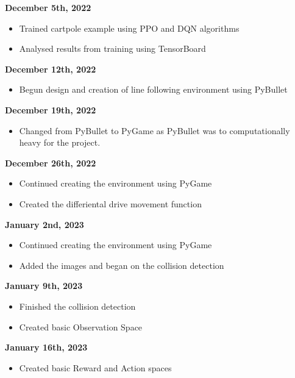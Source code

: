 \documentclass[a4paper,12pt]{article}
\begin{document}
\vspace{.7cm}
\textbf{\large December 5th, 2022}
\begin{itemize}
  \item Trained cartpole example using PPO and DQN algorithms
  \item Analysed results from training using TensorBoard

\end{itemize}
\vspace{.7cm}
\textbf{\large December 12th, 2022}
\begin{itemize}
  \item Begun design and creation of line following environment using PyBullet

\end{itemize}
\vspace{.7cm}
\textbf{\large December 19th, 2022}
\begin{itemize}
  \item Changed from PyBullet to PyGame as PyBullet was to computationally heavy for the project.

\end{itemize}
\vspace{.7cm}
\textbf{\large December 26th, 2022}
\begin{itemize}
  \item Continued creating the environment using PyGame
  \item Created the differiental drive movement function

\end{itemize}
\vspace{.7cm}
\textbf{\large January 2nd, 2023}
\begin{itemize}
  \item Continued creating the environment using PyGame
  \item Added the images and began on the collision detection

\end{itemize}
\vspace{.7cm}
\textbf{\large January 9th, 2023}
\begin{itemize}
  \item Finished the collision detection
  \item Created basic Observation Space

\end{itemize}
\vspace{.7cm}
\textbf{\large January 16th, 2023}
\begin{itemize}
  \item Created basic Reward and Action spaces

\end{itemize}
\end{document}
